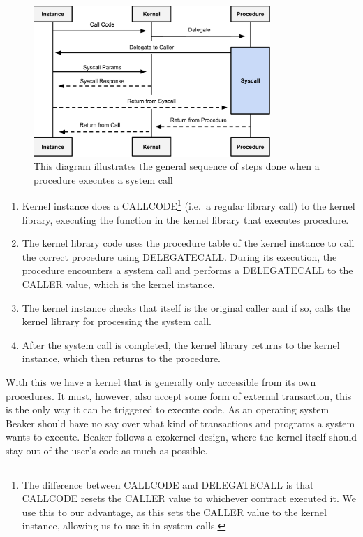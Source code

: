 \documentclass[english,a4paper]{article}
\begin{document}
\begin{figure}[htbp]
\centering
\includegraphics[width=0.8\textwidth]{media/SystemCalls.pdf}
\caption{This diagram illustrates the general sequence of steps
done when a procedure executes a system call}
\end{figure}

\begin{enumerate}
\def\labelenumi{\arabic{enumi}.}
\item
  Kernel instance does a CALLCODE\footnote{The difference between CALLCODE and
  DELEGATECALL is that CALLCODE resets the CALLER value to whichever contract
  executed it. We use this to our advantage, as this sets the CALLER value to
  the kernel instance, allowing us to use it in system calls.} (i.e.~a regular
  library call) to the kernel
  library, executing the function in the kernel library that executes
  procedure.
\item
  The kernel library code uses the procedure table of the kernel
  instance to call the correct procedure using DELEGATECALL. During its
  execution, the procedure encounters a system call and performs a
  DELEGATECALL to the CALLER value, which is the kernel instance.
\item
  The kernel instance checks that itself is the original caller and if
  so, calls the kernel library for processing the system call.
\item
  After the system call is completed, the kernel library returns to the
  kernel instance, which then returns to the procedure.
\end{enumerate}

With this we have a kernel that is generally only accessible from its
own procedures. It must, however, also accept some form of external
transaction, this is the only way it can be triggered to execute code.
As an operating system Beaker should have no say over what kind of
transactions and programs a system wants to execute. Beaker follows a
exokernel design, where the kernel itself should stay out of the user's
code as much as possible.
\end{document}
